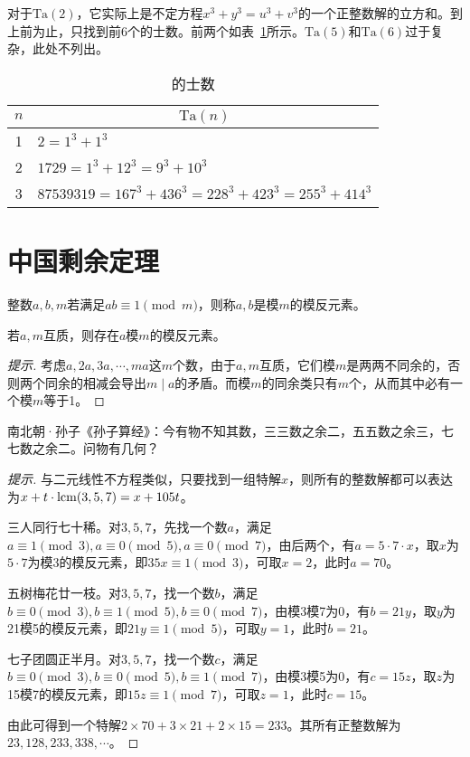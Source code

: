 对于$\mathrm{Ta}(2)$，它实际上是不定方程$x^3+y^3=u^3+v^3$的一个正整数解的立方和。到上前为止，只找到前6个的士数。前两个如表~\ref{tab:taxicab-number}所示。$\mathrm{Ta}(5)$和$\mathrm{Ta}(6)$过于复杂，此处不列出。
\begin{table}[htbp]
  \centering
  \begin{tabular}{cl}
    \toprule
    $n$              & \multicolumn{1}{c}{$\mathrm{Ta}(n)$}\\\midrule
    1                & $2 = 1^3 + 1^3$\\
    2                & $1729=1^3+12^3=9^3+10^3$\\
    3                & $87539319=167^3+436^3=228^3+423^3=255^3+414^3$\\
    \bottomrule
  \end{tabular}
  \caption{的士数}
  \label{tab:taxicab-number}
\end{table}

\section{中国剩余定理}
\label{sec:Chinese-remainder-theorem}

\begin{definition}
  整数$a,b,m$若满足$ab\equiv1\pmod m$，则称$a,b$是模$m$的模反元素。
\end{definition}

\begin{theorem}[模反的存在性]
  若$a,m$互质，则存在$a$模$m$的模反元素。
\end{theorem}
\begin{proof}[提示]
  考虑$a,2a,3a,\cdots,ma$这$m$个数，由于$a,m$互质，它们模$m$是两两不同余的，否则两个同余的相减会导出$m\mid a$的矛盾。而模$m$的同余类只有$m$个，从而其中必有一个模$m$等于1。
\end{proof}

\begin{example}
  南北朝·孙子《孙子算经》：今有物不知其数，三三数之余二，五五数之余三，七七数之余二。问物有几何？
\end{example}
\begin{proof}[提示]
  与二元线性不方程类似，只要找到一组特解$x$，则所有的整数解都可以表达为$x+t\cdot\mathrm{lcm}(3,5,7)=x+105t$。

  三人同行七十稀。对$3,5,7$，先找一个数$a$，满足$a\equiv 1\pmod3, a\equiv0\pmod5, a\equiv0\pmod7$，由后两个，有$a=5\cdot7\cdot x$，取$x$为$5\cdot 7$为模$3$的模反元素，即$35x\equiv1\pmod3$，可取$x=2$，此时$a=70$。

  五树梅花廿一枝。对$3,5,7$，找一个数$b$，满足$b\equiv0\pmod3, b\equiv1\pmod5,b\equiv0\pmod7$，由模3模7为0，有$b=21y$，取$y$为21模5的模反元素，即$21y\equiv1\pmod5$，可取$y=1$，此时$b=21$。

  七子团圆正半月。对$3,5,7$，找一个数$c$，满足$b\equiv0\pmod3, b\equiv0\pmod5,b\equiv1\pmod7$，由模3模5为0，有$c=15z$，取$z$为15模7的模反元素，即$15z\equiv1\pmod7$，可取$z=1$，此时$c=15$。

  由此可得到一个特解$2\times 70+3\times 21+2\times 15=233$。其所有正整数解为$23,128,233,338,\cdots$。
\end{proof}


